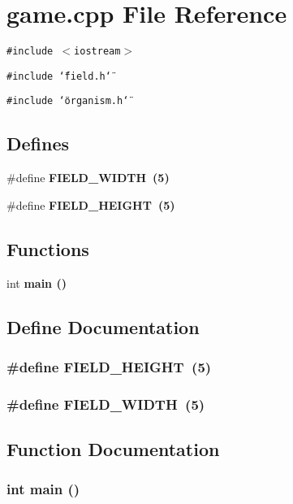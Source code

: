 \section{game.cpp File Reference}
\label{game_8cpp}
{\tt \#include $<$iostream$>$}\par
{\tt \#include \char`\"{}field.h\char`\"{}}\par
{\tt \#include \char`\"{}organism.h\char`\"{}}\par
\subsection*{Defines}
\begin{CompactItemize}
\item 
\#define \bf{FIELD\_\-WIDTH}~(5)
\item 
\#define \bf{FIELD\_\-HEIGHT}~(5)
\end{CompactItemize}
\subsection*{Functions}
\begin{CompactItemize}
\item 
int \bf{main} ()
\end{CompactItemize}


\subsection{Define Documentation}
\subsubsection{\setlength{\rightskip}{0pt plus 5cm}\#define FIELD\_\-HEIGHT~(5)}\label{game_8cpp_90b3ddaf01d4c39af0567b4500e9c4c6}


\subsubsection{\setlength{\rightskip}{0pt plus 5cm}\#define FIELD\_\-WIDTH~(5)}\label{game_8cpp_313353b53d609b3b2b37e1aecf98bf4c}




\subsection{Function Documentation}
\subsubsection{\setlength{\rightskip}{0pt plus 5cm}int main ()}\label{game_8cpp_e66f6b31b5ad750f1fe042a706a4e3d4}


